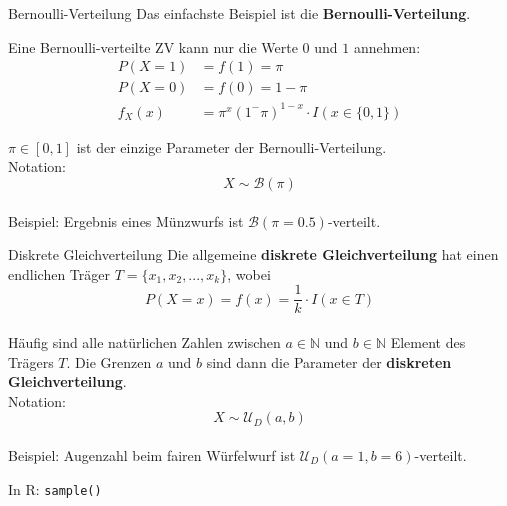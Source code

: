 \documentclass[
  10pt,
  ignorenonframetext,
]{beamer}
\begin{document}
\begin{frame}{Bernoulli-Verteilung}
\protect\hypertarget{bernoulli-verteilung}{}
Das einfachste Beispiel ist die \textbf{Bernoulli-Verteilung}.

Eine Bernoulli-verteilte ZV kann nur die Werte \(0\) und \(1\) annehmen:
\begin{align*}
P(X = 1) & = f(1)  = \pi\\
P(X = 0) & = f(0)  = 1 - \pi \\
f_X(x) & = \pi^x (1^-\pi)^{1-x} \cdot I(x \in \{0, 1\})
\end{align*}

\(\pi \in [0, 1]\) ist der einzige Parameter der Bernoulli-Verteilung.\\

Notation: \[X \sim {\mathcal B}(\pi)\]\\

Beispiel: Ergebnis eines Münzwurfs ist
\({\mathcal B}(\pi = 0.5)\)-verteilt.

\end{frame}

\begin{frame}[fragile]{Diskrete Gleichverteilung}
\protect\hypertarget{diskrete-gleichverteilung}{}
Die allgemeine \textbf{diskrete Gleichverteilung} hat einen endlichen
Träger \({T} = \{x_1, x_2, ..., x_k\}\), wobei
\[ P(X = x) = f(x) = \frac{1}{k} \cdot I(x \in T)\]\\

Häufig sind alle natürlichen Zahlen zwischen \(a \in \mathbb{N}\) und
\(b\in \mathbb{N}\) Element des Trägers \({T}\). Die Grenzen \(a\) und
\(b\) sind dann die Parameter der \textbf{diskreten Gleichverteilung}.\\

Notation: \[X \sim {\mathcal U}_D(a, b)\]\\

Beispiel: Augenzahl beim fairen Würfelwurf ist
\({\mathcal U}_D(a=1, b=6)\)-verteilt.

In R: \texttt{sample()}
\end{frame}
\end{document}
